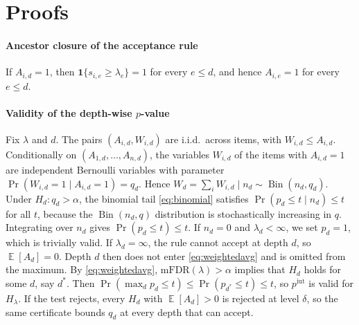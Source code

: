 \documentclass[preprint,12pt]{elsarticle}
\theoremstyle{definition}
\newcommand{\fdr}{\mathrm{mFDR}}
\DeclareMathOperator{\E}{\mathbb{E}}
\DeclareMathOperator{\Bin}{Bin}
\begin{document}
\appendix
\section{Proofs}
\label{app:proofs}

\paragraph{Ancestor closure of the acceptance rule}
If $A_{i,d}=1$, then $\mathbf{1}\{s_{i,e}\ge\lambda_e\}=1$ for every $e\le d$,
and hence $A_{i,e}=1$ for every $e\le d$.

\paragraph{Validity of the depth-wise $p$-value}
Fix $\lambda$ and $d$. The pairs $(A_{i,d},W_{i,d})$ are i.i.d.\ across items,
with $W_{i,d}\le A_{i,d}$. Conditionally on $(A_{1,d},\dots,A_{n,d})$, the
variables $W_{i,d}$ of the items with $A_{i,d}=1$ are independent Bernoulli
variables with parameter $\Pr(W_{i,d}=1\mid A_{i,d}=1)=q_d$. Hence
$W_d=\sum_i W_{i,d}\mid n_d\sim\Bin(n_d,q_d)$. Under $H_d:q_d>\alpha$, the
binomial tail \eqref{eq:binomial} satisfies $\Pr(p_d\le t\mid n_d)\le t$ for all
$t$, because the $\Bin(n_d,q)$ distribution is stochastically increasing in $q$.
Integrating over $n_d$ gives $\Pr(p_d\le t)\le t$. If $n_d=0$ and
$\lambda_d<\infty$, we set $p_d=1$, which is trivially valid. If
$\lambda_d=\infty$, the rule cannot accept at depth $d$, so $\E[A_d]=0$. Depth
$d$ then does not enter \eqref{eq:weightedavg} and is omitted from the maximum.
By \eqref{eq:weightedavg}, $\fdr(\lambda)>\alpha$ implies that $H_d$ holds for
some $d$, say $d^\ast$. Then $\Pr(\max_d p_d\le t)\le\Pr(p_{d^\ast}\le t)\le t$,
so $p^{\mathrm{iut}}$ is valid for $H_\lambda$. If the test rejects, every
$H_d$ with $\E[A_d]>0$ is rejected at level $\delta$, so the same certificate
bounds $q_d$ at every depth that can accept.
\end{document}
